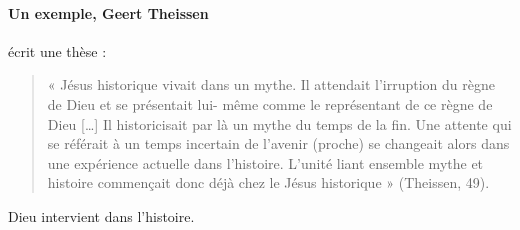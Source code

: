 \paragraph{Un exemple, Geert Theissen} écrit une thèse : 
\begin{quote}
« Jésus historique vivait dans un mythe. Il attendait l'irruption du
règne de Dieu et se présentait lui- même comme le représentant de ce
règne de Dieu {[}\ldots{]} Il historicisait par là un mythe du temps de
la fin. Une attente qui se référait à un temps incertain de l'avenir
(proche) se changeait alors dans une expérience actuelle dans
l'histoire. L'unité liant ensemble mythe et histoire commençait donc
déjà chez le Jésus historique » (Theissen, 49).
\end{quote}

\begin{Def}[mythe]
Dieu intervient dans l'histoire.
\end{Def}
